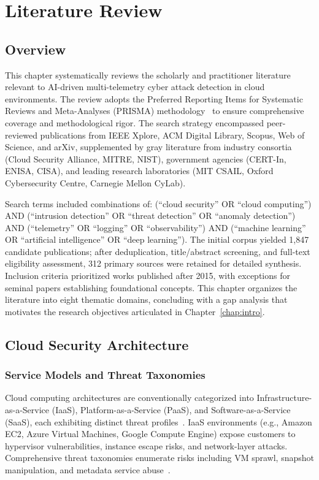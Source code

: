 \chapter{Literature Review}\label{chap:lit}
\section{Overview}\label{sec:lit-overview}
This chapter systematically reviews the scholarly and practitioner literature relevant to AI-driven multi-telemetry cyber attack detection in cloud environments. The review adopts the Preferred Reporting Items for Systematic Reviews and Meta-Analyses (PRISMA) methodology~\cite{prisma2020} to ensure comprehensive coverage and methodological rigor. The search strategy encompassed peer-reviewed publications from IEEE Xplore, ACM Digital Library, Scopus, Web of Science, and arXiv, supplemented by gray literature from industry consortia (Cloud Security Alliance, MITRE, NIST), government agencies (CERT-In, ENISA, CISA), and leading research laboratories (MIT CSAIL, Oxford Cybersecurity Centre, Carnegie Mellon CyLab).

Search terms included combinations of: (``cloud security'' OR ``cloud computing'') AND (``intrusion detection'' OR ``threat detection'' OR ``anomaly detection'') AND (``telemetry'' OR ``logging'' OR ``observability'') AND (``machine learning'' OR ``artificial intelligence'' OR ``deep learning''). The initial corpus yielded 1,847 candidate publications; after deduplication, title/abstract screening, and full-text eligibility assessment, 312 primary sources were retained for detailed synthesis. Inclusion criteria prioritized works published after 2015, with exceptions for seminal papers establishing foundational concepts. This chapter organizes the literature into eight thematic domains, concluding with a gap analysis that motivates the research objectives articulated in Chapter~\ref{chap:intro}.

\section{Cloud Security Architecture}\label{sec:lit-cloud-arch}
\subsection{Service Models and Threat Taxonomies}
Cloud computing architectures are conventionally categorized into Infrastructure-as-a-Service (IaaS), Platform-as-a-Service (PaaS), and Software-as-a-Service (SaaS), each exhibiting distinct threat profiles~\cite{hashizume2013analysis}. IaaS environments (e.g., Amazon EC2, Azure Virtual Machines, Google Compute Engine) expose customers to hypervisor vulnerabilities, instance escape risks, and network-layer attacks. Comprehensive threat taxonomies enumerate risks including VM sprawl, snapshot manipulation, and metadata service abuse~\cite{csa2023threats}.

